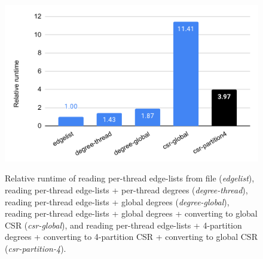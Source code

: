 \begin{figure}[hbtp]
  \centering
  \includegraphics[width=0.99\linewidth]{out/optimize-csr.pdf} \\[-2ex]
  \caption{Relative runtime of reading per-thread edge-lists from file (\textit{edgelist}), reading per-thread edge-lists + per-thread degrees (\textit{degree-thread}), reading per-thread edge-lists + global degrees (\textit{degree-global}), reading per-thread edge-lists + global degrees + converting to global CSR (\textit{csr-global}), and reading per-thread edge-lists + 4-partition degrees + converting to 4-partition CSR + converting to global CSR (\textit{csr-partition-4}).}
  \label{fig:optimize-csr}
\end{figure}
